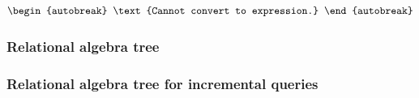 \begin{align*}
\begin{autobreak}
\text{Cannot convert to expression.}
\end{autobreak}
\end{align*}

\subsubsection*{Relational algebra tree}


\subsubsection*{Relational algebra tree for incremental queries}

